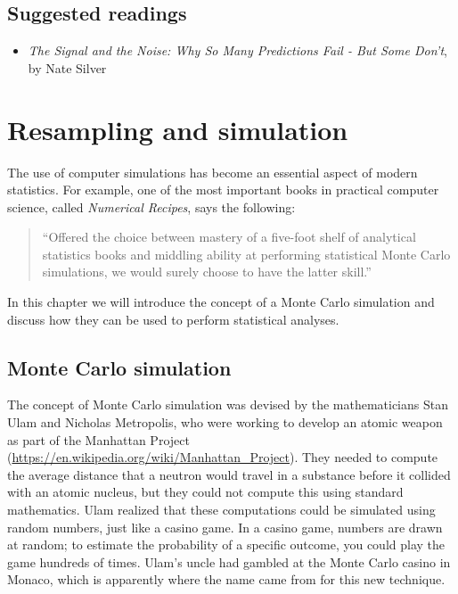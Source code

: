 \documentclass[]{book}
\providecommand{\tightlist}{%
  \setlength{\itemsep}{0pt}\setlength{\parskip}{0pt}}
\theoremstyle{definition}
\theoremstyle{definition}
\theoremstyle{definition}
\theoremstyle{remark}
\begin{document}
\section{Suggested readings}\label{suggested-readings-4}

\begin{itemize}
\tightlist
\item
  \emph{The Signal and the Noise: Why So Many Predictions Fail - But
  Some Don't}, by Nate Silver
\end{itemize}

\chapter{Resampling and simulation}\label{resampling-and-simulation}

The use of computer simulations has become an essential aspect of modern
statistics. For example, one of the most important books in practical
computer science, called \emph{Numerical Recipes}, says the following:

\begin{quote}
``Offered the choice between mastery of a five-foot shelf of analytical
statistics books and middling ability at performing statistical Monte
Carlo simulations, we would surely choose to have the latter skill.''
\end{quote}

In this chapter we will introduce the concept of a Monte Carlo
simulation and discuss how they can be used to perform statistical
analyses.

\section{Monte Carlo simulation}\label{monte-carlo-simulation}

The concept of Monte Carlo simulation was devised by the mathematicians
Stan Ulam and Nicholas Metropolis, who were working to develop an atomic
weapon as part of the Manhattan Project
(\url{https://en.wikipedia.org/wiki/Manhattan_Project}). They needed to
compute the average distance that a neutron would travel in a substance
before it collided with an atomic nucleus, but they could not compute
this using standard mathematics. Ulam realized that these computations
could be simulated using random numbers, just like a casino game. In a
casino game, numbers are drawn at random; to estimate the probability of
a specific outcome, you could play the game hundreds of times. Ulam's
uncle had gambled at the Monte Carlo casino in Monaco, which is
apparently where the name came from for this new technique.
\end{document}

